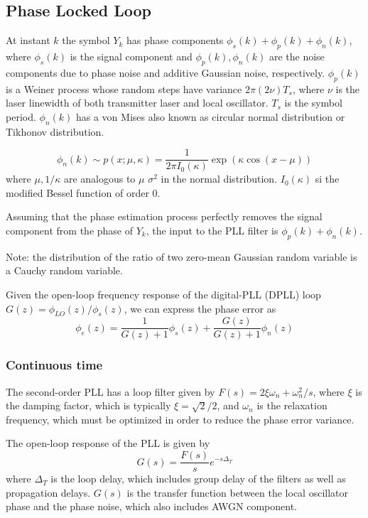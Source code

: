\documentclass[a4paper]{article}
\begin{document}
\subsection{Phase Locked Loop}

At instant $k$ the symbol $Y_k$ has phase components $\phi_s(k) + \phi_p(k) + \phi_n(k)$, where $\phi_s(k)$ is the signal component and  $\phi_p(k), \phi_n(k)$ are the noise components due to phase noise and additive Gaussian noise, respectively. $\phi_p(k)$ is a Weiner process whose random steps have variance $2\pi(2\nu)T_s$, where $\nu$ is the laser linewidth of both transmitter laser and local oscillator. $T_s$ is the symbol period. $\phi_n(k)$ has a von Mises also known as circular normal distribution or Tikhonov distribution.

\begin{equation} \label{eq:Tikhonov-pdf}
	\phi_n(k) \sim p(x; \mu, \kappa) = \frac{1}{2\pi I_0(\kappa)}\exp(\kappa\cos(x-\mu))
\end{equation}
where $\mu, 1/\kappa$ are analogous to $\mu$ $\sigma^2$ in the normal distribution. $I_0(\kappa)$ si the modified Bessel function of order 0.

Assuming that the phase estimation process perfectly removes the signal component from the phase of $Y_k$, the input to the PLL filter is $\phi_p(k) + \phi_n(k)$.

Note: the distribution of the ratio of two zero-mean Gaussian random variable is a Cauchy random variable.

Given the open-loop frequency response of the digital-PLL (DPLL) loop $G(z) = \phi_{LO}(z)/\phi_s(z)$, we can express the phase error as
\begin{equation}
	\phi_e(z) = \frac{1}{G(z)+1}\phi_s(z) + \frac{G(z)}{G(z) + 1}\phi_n(z)
\end{equation}


\subsubsection{Continuous time}

The second-order PLL has a loop filter given by $F(s) = 2\xi\omega_n + \omega_n^2/s$, where $\xi$ is the damping factor, which is typically $\xi = \sqrt{2}/2$, and $\omega_n$ is the relaxation frequency, which must be optimized in order to reduce the phase error variance.

The open-loop response of the PLL is given by
\begin{equation}
G(s) = \frac{F(s)}{s}e^{-s\Delta_T}
\end{equation}
where $\Delta_T$ is the loop delay, which includes group delay of the filters as well as propagation delays. $G(s)$ is the transfer function between the local oscillator phase and the phase noise, which also includes AWGN component. 
\end{document}
